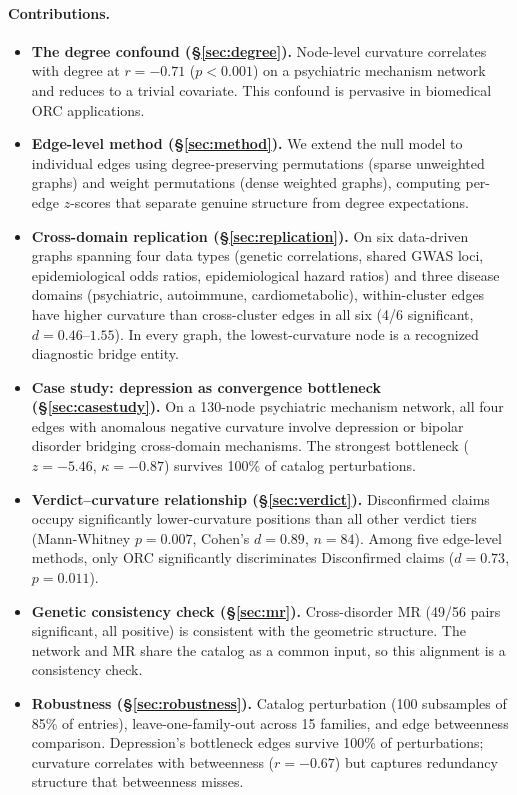 \documentclass[11pt]{article}
\begin{document}
\paragraph{Contributions.}
\begin{itemize}
\item \textbf{The degree confound (\S\ref{sec:degree}).} Node-level curvature correlates with degree at $r = -0.71$ ($p < 0.001$) on a psychiatric mechanism network and reduces to a trivial covariate. This confound is pervasive in biomedical ORC applications.
\item \textbf{Edge-level method (\S\ref{sec:method}).} We extend the null model to individual edges using degree-preserving permutations (sparse unweighted graphs) and weight permutations (dense weighted graphs), computing per-edge $z$-scores that separate genuine structure from degree expectations.
\item \textbf{Cross-domain replication (\S\ref{sec:replication}).} On six data-driven graphs spanning four data types (genetic correlations, shared GWAS loci, epidemiological odds ratios, epidemiological hazard ratios) and three disease domains (psychiatric, autoimmune, cardiometabolic), within-cluster edges have higher curvature than cross-cluster edges in all six (4/6 significant, $d = 0.46$--$1.55$). In every graph, the lowest-curvature node is a recognized diagnostic bridge entity.
\item \textbf{Case study: depression as convergence bottleneck (\S\ref{sec:casestudy}).} On a 130-node psychiatric mechanism network, all four edges with anomalous negative curvature involve depression or bipolar disorder bridging cross-domain mechanisms. The strongest bottleneck ($z = -5.46$, $\kappa = -0.87$) survives 100\% of catalog perturbations.
\item \textbf{Verdict--curvature relationship (\S\ref{sec:verdict}).} Disconfirmed claims occupy significantly lower-curvature positions than all other verdict tiers (Mann-Whitney $p = 0.007$, Cohen's $d = 0.89$, $n = 84$). Among five edge-level methods, only ORC significantly discriminates Disconfirmed claims ($d = 0.73$, $p = 0.011$).
\item \textbf{Genetic consistency check (\S\ref{sec:mr}).} Cross-disorder MR (49/56 pairs significant, all positive) is consistent with the geometric structure. The network and MR share the catalog as a common input, so this alignment is a consistency check.
\item \textbf{Robustness (\S\ref{sec:robustness}).} Catalog perturbation (100 subsamples of 85\% of entries), leave-one-family-out across 15 families, and edge betweenness comparison. Depression's bottleneck edges survive 100\% of perturbations; curvature correlates with betweenness ($r = -0.67$) but captures redundancy structure that betweenness misses.
\end{itemize}
\end{document}
